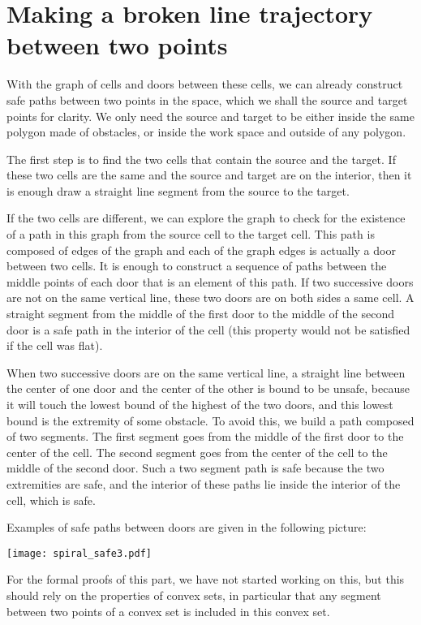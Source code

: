 \documentclass{easychair}
\begin{document}
\section{Making a broken line trajectory between two points}
With the graph of cells and doors between these cells, we can already
construct safe paths between two points in the space, which we shall
the source and target points for clarity.  We only need the source and
target to be either inside the same polygon made of obstacles, or
inside the work space and outside of any polygon.

The first step is to find the two cells that contain the source and
the target.  If these two cells are the same and the source and target
are on the interior, then it is enough draw a straight line segment from the
source to the target.

If the two cells are different, we can explore the graph to check for
the existence of a path in this graph from the source cell to the
target cell.  This path is composed of edges of the graph and each of
the graph edges is actually a door between two cells.  It is enough to
construct a sequence of paths between the middle points of each door
that is an element of this path.  If two successive doors are not on the same
vertical line, these two doors are on both sides a same cell.  A
straight segment from the middle of the first door to the middle of
the second door is a safe path in the interior of the cell (this
property would not be satisfied if the cell was flat).

When two successive doors are on the same vertical line, a straight
line between the center of one door and the center of the other is
bound to be unsafe, because it will touch the lowest bound of the
highest of the two doors, and this lowest bound is the extremity of
some obstacle.  To avoid this, we build a path composed of two
segments.  The first segment goes from the middle of the first door to
the center of the cell.  The second segment goes from the center of
the cell to the middle of the second door.  Such a two segment path is
safe because the two extremities are safe, and the interior of these
paths lie inside the interior of the cell, which is safe.

Examples of safe paths between doors are given in the following
picture:
\begin{center}
\texttt{[image: spiral\_safe3.pdf]}
\end{center}


For the formal proofs of this part, we have not started working on
this, but this should rely on the properties of convex sets, in
particular that any segment between two points of a convex set is
included in this convex set.
\end{document}
